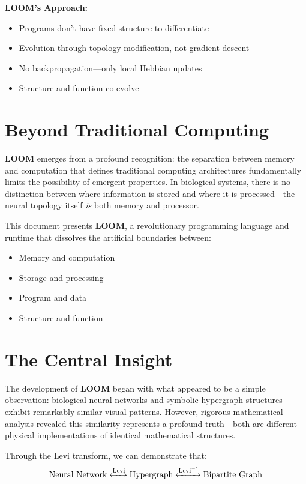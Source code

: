 \documentclass[12pt,a4paper,openany]{book} %
\newcommand{\loom}{\textbf{LOOM}}
\begin{document}
\textbf{LOOM's Approach:}
\begin{itemize}
\item Programs don't have fixed structure to differentiate
\item Evolution through topology modification, not gradient descent
\item No backpropagation—only local Hebbian updates
\item Structure and function co-evolve
\end{itemize}


\section{Beyond Traditional Computing}

\loom{} emerges from a profound recognition: the separation between memory and computation that defines traditional computing architectures fundamentally limits the possibility of emergent properties. In biological systems, there is no distinction between where information is stored and where it is processed—the neural topology itself \textit{is} both memory and processor.

This document presents \loom{}, a revolutionary programming language and runtime that dissolves the artificial boundaries between:
\begin{itemize}
    \item Memory and computation
    \item Storage and processing
    \item Program and data
    \item Structure and function
\end{itemize}

\section{The Central Insight}

The development of \loom{} began with what appeared to be a simple observation: biological neural networks and symbolic hypergraph structures exhibit remarkably similar visual patterns. However, rigorous mathematical analysis revealed this similarity represents a profound truth—both are different physical implementations of identical mathematical structures.

Through the Levi transform, we can demonstrate that:
\begin{equation}
\text{Neural Network} \xleftrightarrow{\text{Levi}} \text{Hypergraph} \xleftrightarrow{\text{Levi}^{-1}} \text{Bipartite Graph}
\end{equation}
\end{document}
